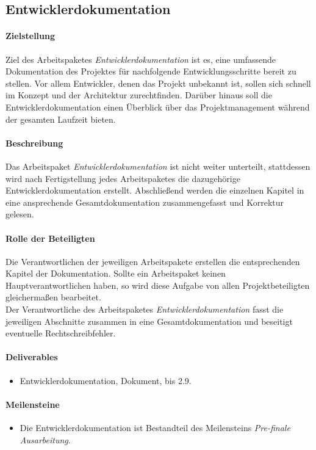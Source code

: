\subsection{Entwicklerdokumentation}
\label{ap10}

\paragraph{Zielstellung}\noindent
Ziel des Arbeitspaketes \textit{Entwicklerdokumentation} ist es, eine umfassende Dokumentation des Projektes für nachfolgende Entwicklungsschritte bereit zu stellen. Vor allem Entwickler, denen das Projekt unbekannt ist, sollen sich schnell im Konzept und der Architektur zurechtfinden. Darüber hinaus soll die Entwicklerdokumentation einen Überblick über das Projektmanagement während der gesamten Laufzeit bieten.

\paragraph{Beschreibung}\noindent
Das Arbeitspaket \textit{Entwicklerdokumentation} ist nicht weiter unterteilt, stattdessen wird nach Fertigstellung jedes Arbeitspaketes die dazugehörige Entwicklerdokumentation erstellt. Abschließend werden die einzelnen Kapitel in eine ansprechende Gesamtdokumentation zusammengefasst und Korrektur gelesen.

\paragraph{Rolle der Beteiligten}\noindent
Die Verantwortlichen der jeweiligen Arbeitspakete erstellen die entsprechenden Kapitel der Dokumentation. Sollte ein Arbeitspaket keinen Hauptverantwortlichen haben, so wird diese Aufgabe von allen Projektbeteiligten gleichermaßen bearbeitet.\\
Der Verantwortliche des Arbeitspaketes \textit{Entwicklerdokumentation} fasst die jeweiligen Abschnitte zusammen in eine Gesamtdokumentation und beseitigt eventuelle Rechtschreibfehler.

\paragraph{Deliverables}\noindent
\begin{itemize}
\item Entwicklerdokumentation, Dokument, bis 2.9.
\end{itemize}

\paragraph{Meilensteine}\noindent
\begin{itemize}
\item Die Entwicklerdokumentation ist Bestandteil des Meilensteins \textit{Pre-finale Ausarbeitung}.
\end{itemize}